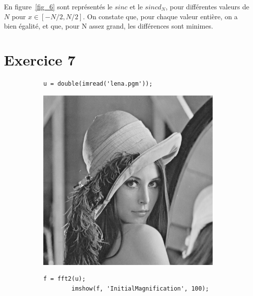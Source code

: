 \documentclass[12pt,a4paper,onecolumn]{article}
\begin{document}
En figure~\ref{fig_6} sont représentés le \(sinc\) et le \(sincd_N\), pour différentes valeurs de \(N\) pour \(x \in[-N/2, N/2]\). On constate que, pour chaque valeur entière, on a bien égalité, et que, pour N assez grand, les différences sont minimes.

\section{Exercice 7}

\begin{figure}[H]
	\centering
	\begin{subfigure}[b]{\textwidth}
		\centering
		\begin{lstlisting}[frame = none, numbers = none]
		u = double(imread('lena.pgm'));
		\end{lstlisting}
		\includegraphics[scale = 1, height = 0.3\textheight]{lena.png}
	\end{subfigure}
	\vspace{2cm}
	\begin{subfigure}[b]{\textwidth}
		\centering
		\begin{lstlisting}[frame=none, numbers = none]
		f = fft2(u);
		imshow(f, 'InitialMagnification', 100);
		\end{lstlisting}

\end{subfigure}
\end{figure}
\end{document}
